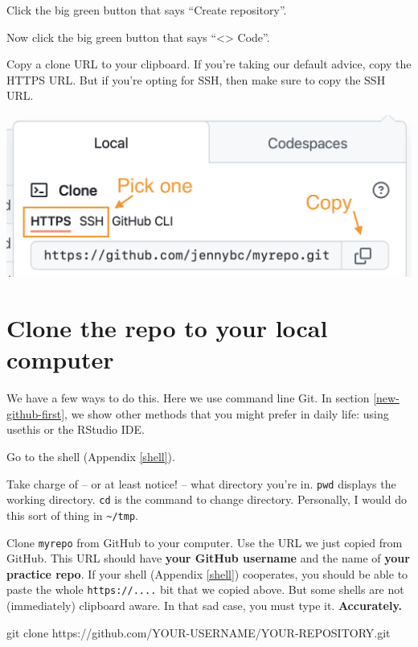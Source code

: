 \documentclass[
]{book}
\newenvironment{Shaded}{\begin{snugshade}}{\end{snugshade}}
\newcommand{\NormalTok}[1]{#1}
\begin{document}
Click the big green button that says ``Create repository''.

Now click the big green button that says ``\textless\textgreater{} Code''.

Copy a clone URL to your clipboard.
If you're taking our default advice, copy the HTTPS URL.
But if you're opting for SSH, then make sure to copy the SSH URL.

\begin{center}\includegraphics[width=0.6\linewidth]{img/github-https-or-ssh-url-annotated} \end{center}

\section{Clone the repo to your local computer}\label{git-clone-command-line}

We have a few ways to do this.
Here we use command line Git.
In section \ref{new-github-first}, we show other methods that you might prefer in daily life:
using usethis or the RStudio IDE.

Go to the shell (Appendix \ref{shell}).

Take charge of -- or at least notice! -- what directory you're in.
\texttt{pwd} displays the working directory.
\texttt{cd} is the command to change directory.
Personally, I would do this sort of thing in \texttt{\textasciitilde{}/tmp}.

Clone \texttt{myrepo} from GitHub to your computer.
Use the URL we just copied from GitHub.
This URL should have \textbf{your GitHub username} and the name of \textbf{your practice repo}.
If your shell (Appendix \ref{shell}) cooperates, you should be able to paste the whole \texttt{https://....} bit that we copied above.
But some shells are not (immediately) clipboard aware.
In that sad case, you must type it. \textbf{Accurately.}

\begin{Shaded}
\begin{Highlighting}[]
\NormalTok{git clone https://github.com/YOUR{-}USERNAME/YOUR{-}REPOSITORY.git}
\end{Highlighting}
\end{Shaded}
\end{document}
